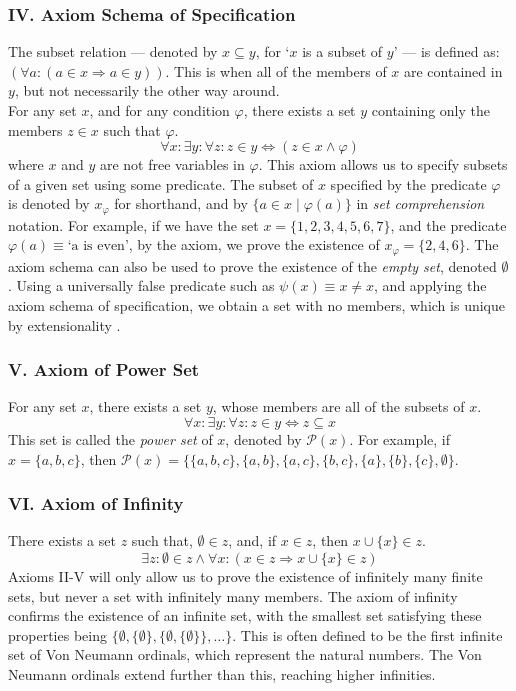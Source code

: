 \documentclass[11pt]{report}
\theoremstyle{definition}
\theoremstyle{theorem}
\theoremstyle{lemma}
\begin{document}
\subsubsection*{IV. Axiom Schema of Specification}
The subset relation --- denoted by $x\subseteq y$, for `$x$ is a subset of $y$' --- is defined as: $(\forall a: (a\in x \Rightarrow a\in y))$. This is when all of the members of $x$ are contained in $y$, but not necessarily the other way around.\\
\noindent
For any set $x$, and for any condition $\varphi$, there exists a set $y$ containing only the members $z \in x$ such that $\varphi$.
$$\forall x: \exists y: \forall z: z\in y \Leftrightarrow (z \in x \wedge \varphi)$$
where $x$ and $y$ are not free variables in $\varphi$.
This axiom allows us to specify subsets of a given set using some predicate. The subset of $x$ specified by the predicate $\varphi$ is denoted by $x_\varphi$ for shorthand, and by $\{a\in x \mid \varphi(a)\}$ in \emph{set comprehension} notation. 
For example, if we have the set $x = \{1,2,3,4,5,6,7\}$, and the predicate $\varphi(a) \equiv \text{`a is even'}$, by the axiom, we prove the existence of $x_\varphi = \{2,4,6\}$.
The axiom schema can also be used to prove the existence of the \emph{empty set}, denoted $\emptyset$. 
Using a universally false predicate such as $\psi(x) \equiv x\neq x$, and applying the axiom schema of specification, we obtain a set with no members, which is unique by extensionality . 

\subsubsection*{V. Axiom of Power Set}
For any set $x$, there exists a set $y$, whose members are all of the subsets of $x$.
$$\forall x: \exists y: \forall z: z\in y \Leftrightarrow z \subseteq x$$
This set is called the \emph{power set} of $x$, denoted by $\mathcal{P}(x)$.
For example, if $x = \{a,b,c\}$, then $\mathcal{P}(x) = \{\{a,b,c\},\{a,b\},\{a,c\},\{b,c\}, \{a\}, \{b\}, \{c\}, \emptyset\}$.

\subsubsection*{VI. Axiom of Infinity}
There exists a set $z$ such that, $\emptyset \in z$, and, if $x\in z$, then $x \cup \{x\}\in z$.
$$\exists z: \emptyset\in z \wedge \forall x: (x\in z \Rightarrow x \cup \{x\}\in z)$$
Axioms II-V will only allow us to prove the existence of infinitely many finite sets, but never a set with infinitely many members. 
The axiom of infinity confirms the existence of an infinite set, with the smallest set satisfying these properties being $\{ \emptyset, \{\emptyset\}, \{\emptyset, \{\emptyset\}\},\ldots \}$. 
This is often defined to be the first infinite set of Von Neumann ordinals, which represent the natural numbers. 
The Von Neumann ordinals extend further than this, reaching higher infinities.
\end{document}
